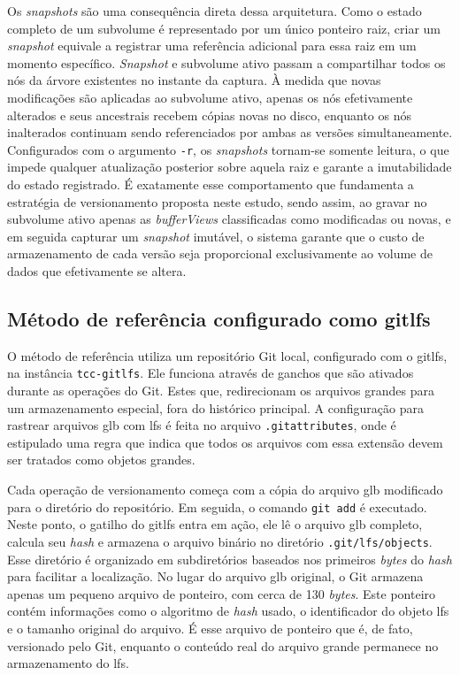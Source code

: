 Os \textit{snapshots} são uma consequência direta dessa arquitetura. Como o estado
completo de um subvolume é representado por um único ponteiro raiz, criar um
\textit{snapshot} equivale a registrar uma referência adicional para essa raiz em um
momento específico. \textit{Snapshot} e subvolume ativo passam a compartilhar todos
os nós da árvore existentes no instante da captura. À medida que novas modificações
são aplicadas ao subvolume ativo, apenas os nós efetivamente alterados e seus
ancestrais recebem cópias novas no disco, enquanto os nós inalterados continuam
sendo referenciados por ambas as versões simultaneamente. Configurados com o
argumento \texttt{-r}, os \textit{snapshots} tornam-se somente leitura, o que impede
qualquer atualização posterior sobre aquela raiz e garante a imutabilidade do estado
registrado. É exatamente esse comportamento que fundamenta a estratégia de
versionamento proposta neste estudo, sendo assim, ao gravar no subvolume ativo
apenas as \textit{bufferViews} classificadas como modificadas ou novas, e em seguida
capturar um \textit{snapshot} imutável, o sistema garante que o custo de
armazenamento de cada versão seja proporcional exclusivamente ao volume de dados que
efetivamente se altera.

\subsection{Método de referência configurado como \gls{gitlfs}}

O método de referência utiliza um repositório Git local, configurado com o
\gls{gitlfs}, na instância \texttt{tcc-gitlfs}. Ele funciona através de ganchos que
são ativados durante as operações do Git. Estes que, redirecionam os arquivos
grandes para um armazenamento especial, fora do histórico principal. A configuração
para rastrear arquivos \gls{glb} com \gls{lfs} é feita no arquivo
\texttt{.gitattributes}, onde é estipulado uma regra que indica que todos os
arquivos com essa extensão devem ser tratados como objetos grandes.

Cada operação de versionamento começa com a cópia do arquivo \gls{glb} modificado
para o diretório do repositório. Em seguida, o comando \texttt{git add} é executado.
Neste ponto, o gatilho do \gls{gitlfs} entra em ação, ele lê o arquivo \gls{glb}
completo, calcula seu \textit{hash} e armazena o arquivo binário no diretório
\texttt{.git/lfs/objects}. Esse diretório é organizado em subdiretórios baseados nos
primeiros \textit{bytes} do \textit{hash} para facilitar a localização. No lugar do
arquivo \gls{glb} original, o Git armazena apenas um pequeno arquivo de ponteiro,
com cerca de 130 \textit{bytes}. Este ponteiro contém informações como o algoritmo
de \textit{hash} usado, o identificador do objeto \gls{lfs} e o tamanho original do
arquivo. É esse arquivo de ponteiro que é, de fato, versionado pelo Git, enquanto o
conteúdo real do arquivo grande permanece no armazenamento do \gls{lfs}.

